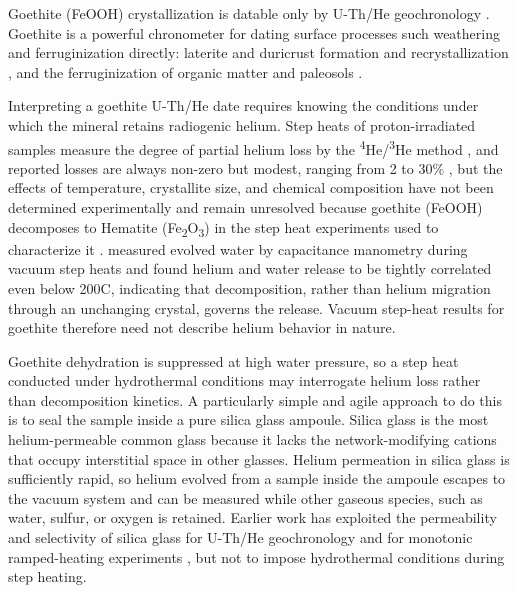 Goethite (FeOOH) crystallization is datable only by U-Th/He geochronology \citep{shustervasconcelos2005,farley2024}. Goethite is a powerful chronometer for dating surface processes such weathering and ferruginization directly: laterite and duricrust formation and recrystallization \citep{monteiro2014,allard2018}, and the ferruginization of organic matter and paleosols \citep{heim2006,yappshuster2011,vasconcelos2013,danisik2013,hofmann2017}. 

Interpreting a goethite U-Th/He date requires knowing the conditions under which the mineral retains radiogenic helium. Step heats of proton-irradiated samples measure the degree of partial helium loss by the \textsuperscript{4}He/\textsuperscript{3}He method \citep{shustervasconcelos2005}, and reported losses are always non-zero but modest, ranging from 2 to 30\% \citep{shustervasconcelos2005,heim2006,hofmann2017,deng2017}, but the effects of temperature, crystallite size, and chemical composition have not been determined experimentally and remain unresolved because goethite (FeOOH) decomposes to Hematite (Fe\textsubscript{2}O\textsubscript{3}) in the step heat experiments used to characterize it \citep{farley2024}. \citet{farley2024} measured evolved water by capacitance manometry during vacuum step heats and found helium and water release to be tightly correlated even below 200\textdegree C, indicating that decomposition, rather than helium migration through an unchanging crystal, governs the release. Vacuum step-heat results for goethite therefore need not describe helium behavior in nature.

Goethite dehydration is suppressed at high water pressure, so a step heat conducted under hydrothermal conditions may interrogate helium loss rather than decomposition kinetics. 
A particularly simple and agile approach to do this is to seal the sample inside a pure silica glass ampoule. Silica glass is the most helium-permeable common glass \citep{norton1953,altemose1961} because it lacks the network-modifying cations that occupy interstitial space in other glasses. Helium permeation in silica glass is sufficiently rapid, so helium evolved from a sample inside the ampoule escapes to the vacuum system and can be measured while other gaseous species, such as water, sulfur, or oxygen is retained. Earlier work has exploited the permeability and selectivity of silica glass for U-Th/He geochronology \citep{yakubovich2020,yakubovich2021,yakubovich2024} and for monotonic ramped-heating experiments \citep{yakubovich2019}, but not to impose hydrothermal conditions during step heating. 

